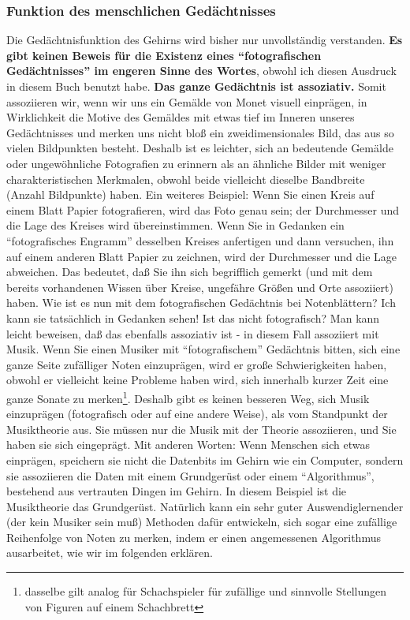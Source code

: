 
\subsubsection{Funktion des menschlichen Gedächtnisses}
\label{c1iii6m}

Die Gedächtnisfunktion des Gehirns wird bisher nur unvollständig verstanden.
\textbf{Es gibt keinen Beweis für die Existenz eines \enquote{fotografischen Gedächtnisses} im engeren Sinne des Wortes}, obwohl ich diesen Ausdruck in diesem Buch benutzt habe.
\textbf{Das ganze Gedächtnis ist assoziativ.}
Somit assoziieren wir, wenn wir uns ein Gemälde von Monet visuell einprägen, in Wirklichkeit die Motive des Gemäldes mit etwas tief im Inneren unseres Gedächtnisses und merken uns nicht bloß ein zweidimensionales Bild, das aus so vielen Bildpunkten besteht.
Deshalb ist es leichter, sich an bedeutende Gemälde oder ungewöhnliche Fotografien zu erinnern als an ähnliche Bilder mit weniger charakteristischen Merkmalen, obwohl beide vielleicht dieselbe Bandbreite (Anzahl Bildpunkte) haben.
Ein weiteres Beispiel: Wenn Sie einen Kreis auf einem Blatt Papier fotografieren, wird das Foto genau sein; der Durchmesser und die Lage des Kreises wird übereinstimmen.
Wenn Sie in Gedanken ein \enquote{fotografisches Engramm} desselben Kreises anfertigen und dann versuchen, ihn auf einem anderen Blatt Papier zu zeichnen, wird der Durchmesser und die Lage abweichen.
Das bedeutet, daß Sie ihn sich begrifflich gemerkt (und mit dem bereits vorhandenen Wissen über Kreise, ungefähre Größen und Orte assoziiert) haben.
Wie ist es nun mit dem fotografischen Gedächtnis bei Notenblättern?
Ich kann sie tatsächlich in Gedanken sehen!
Ist das nicht fotografisch?
Man kann leicht beweisen, daß das ebenfalls assoziativ ist - in diesem Fall assoziiert mit Musik.
Wenn Sie einen Musiker mit \enquote{fotografischem} Gedächtnis bitten, sich eine ganze Seite zufälliger Noten einzuprägen, wird er große Schwierigkeiten haben, obwohl er vielleicht keine Probleme haben wird, sich innerhalb kurzer Zeit eine ganze Sonate zu merken\footnote{dasselbe gilt analog für Schachspieler für zufällige und sinnvolle Stellungen von Figuren auf einem Schachbrett}.
Deshalb gibt es keinen besseren Weg, sich Musik einzuprägen (fotografisch oder auf eine andere Weise), als vom Standpunkt der Musiktheorie aus.
Sie müssen nur die Musik mit der Theorie assoziieren, und Sie haben sie sich eingeprägt.
Mit anderen Worten: Wenn Menschen sich etwas einprägen, speichern sie nicht die Datenbits im Gehirn wie ein Computer, sondern sie assoziieren die Daten mit einem Grundgerüst oder einem \enquote{Algorithmus}, bestehend aus vertrauten Dingen im Gehirn.
In diesem Beispiel ist die Musiktheorie das Grundgerüst.
Natürlich kann ein sehr guter Auswendiglernender (der kein Musiker sein muß) Methoden dafür entwickeln, sich sogar eine zufällige Reihenfolge von Noten zu merken, indem er einen angemessenen Algorithmus ausarbeitet, wie wir im folgenden erklären.

